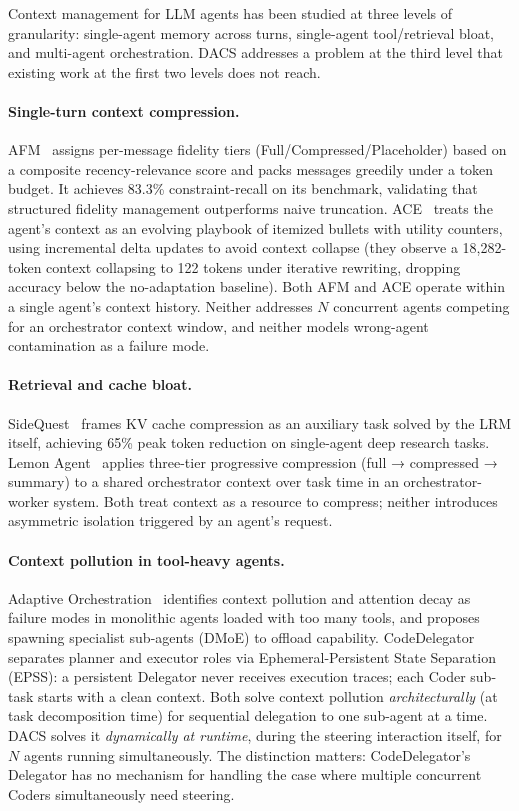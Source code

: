 \documentclass{article}
\begin{document}
Context management for LLM agents has been studied at three levels of
granularity: single-agent memory across turns, single-agent tool/retrieval
bloat, and multi-agent orchestration.
DACS addresses a problem at the third level that existing work at the
first two levels does not reach.

\paragraph{Single-turn context compression.}
AFM~\citep{afm2024} assigns per-message fidelity tiers
(Full/Compressed/Placeholder) based on a composite recency-relevance score
and packs messages greedily under a token budget.
It achieves 83.3\% constraint-recall on its benchmark, validating that
structured fidelity management outperforms naive truncation.
ACE~\citep{ace2026} treats the agent's context as an evolving playbook
of itemized bullets with utility counters, using incremental delta updates
to avoid context collapse (they observe a 18{,}282-token context collapsing
to 122 tokens under iterative rewriting, dropping accuracy below the
no-adaptation baseline).
Both AFM and ACE operate within a single agent's context history.
Neither addresses $N$ concurrent agents competing for an orchestrator
context window, and neither models wrong-agent contamination as a failure
mode.

\paragraph{Retrieval and cache bloat.}
SideQuest~\citep{sidequest2025} frames KV cache compression as an
auxiliary task solved by the LRM itself, achieving 65\% peak token
reduction on single-agent deep research tasks.
Lemon Agent~\citep{lemon2025} applies three-tier progressive compression
(full → compressed → summary) to a shared orchestrator context over task
time in an orchestrator-worker system.
Both treat context as a resource to compress; neither introduces asymmetric
isolation triggered by an agent's request.

\paragraph{Context pollution in tool-heavy agents.}
Adaptive Orchestration~\citep{adaptorch2025} identifies context pollution
and attention decay as failure modes in monolithic agents loaded with too
many tools, and proposes spawning specialist sub-agents (DMoE) to offload
capability.
CodeDelegator~\citep{codedelegator2025} separates planner and executor
roles via Ephemeral-Persistent State Separation (EPSS): a persistent
Delegator never receives execution traces; each Coder sub-task starts with
a clean context.
Both solve context pollution \emph{architecturally} (at task decomposition
time) for sequential delegation to one sub-agent at a time.
DACS solves it \emph{dynamically at runtime}, during the steering
interaction itself, for $N$ agents running simultaneously.
The distinction matters: CodeDelegator's Delegator has no mechanism for
handling the case where multiple concurrent Coders simultaneously need
steering.
\end{document}

